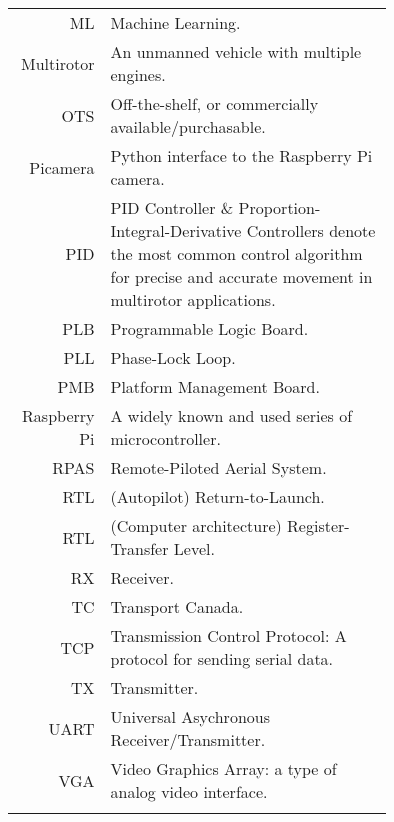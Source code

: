\begin{tabular}[h]{rp{0.75\linewidth}}
    ML & Machine Learning.\\
    Multirotor & An unmanned vehicle with multiple engines. \\
    OTS & Off-the-shelf, or commercially available/purchasable. \\
    Picamera & Python interface to the Raspberry Pi camera. \\
    PID & PID Controller \& Proportion-Integral-Derivative Controllers denote the most common control algorithm for precise and accurate movement in multirotor applications.\\
    PLB & Programmable Logic Board. \\
    PLL & Phase-Lock Loop. \\
    PMB & Platform Management Board. \\
    Raspberry Pi & A widely known and used series of microcontroller. \\
    RPAS & Remote-Piloted Aerial System.\\
    RTL & (Autopilot) Return-to-Launch.\\
    RTL & (Computer architecture) Register-Transfer Level.\\
    RX & Receiver.\\
    TC & Transport Canada.\\
    TCP & Transmission Control Protocol: A protocol for sending serial data. \\
    TX & Transmitter.\\\
    UART & Universal Asychronous Receiver/Transmitter. \\
    VGA & Video Graphics Array: a type of analog video interface. \\
     & \\

    \hline

\end{tabular}
